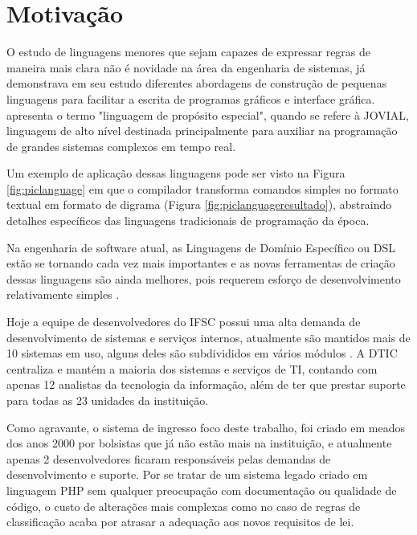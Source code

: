 \section{Motivação}
\label{motivacao}

O estudo de linguagens menores que sejam capazes de expressar regras de maneira mais clara não é novidade na área da engenharia de sistemas,  já demonstrava em seu estudo diferentes abordagens de construção de pequenas linguagens para facilitar a escrita de programas gráficos e interface gráfica.  apresenta o termo "linguagem de propósito especial", quando se refere à \gls{JOVIAL}, linguagem de alto nível destinada principalmente para auxiliar na programação de grandes sistemas complexos em tempo real. 

Um exemplo de aplicação dessas linguagens pode ser visto na Figura \ref{fig:piclanguage} em que o compilador transforma comandos simples no formato textual em formato de digrama (Figura \ref{fig:piclanguageresultado}), abstraindo detalhes específicos das linguagens tradicionais de programação da época.





Na engenharia de software atual, as Linguagens de Domínio Específico ou \gls{DSL} estão se tornando cada vez mais importantes e as novas ferramentas de criação dessas linguagens são ainda melhores, pois requerem esforço de desenvolvimento relativamente simples \cite{dslengineering}.


Hoje a equipe de desenvolvedores do \gls{IFSC} possui uma alta demanda de desenvolvimento de sistemas e serviços internos, atualmente são mantidos mais de 10 sistemas em uso, alguns deles são subdivididos em vários módulos \cite{catalogoifsc}. A \gls{DTIC} centraliza e mantém a maioria dos sistemas e serviços de TI, contando com apenas 12 analistas da tecnologia da informação, além de ter que prestar suporte para todas as 23 unidades da instituição. 

Como agravante, o sistema de ingresso foco deste trabalho, foi criado em meados dos anos 2000 por bolsistas que já não estão mais na instituição, e atualmente apenas 2 desenvolvedores ficaram responsáveis pelas demandas de desenvolvimento e suporte. Por se tratar de um sistema legado criado em linguagem PHP sem qualquer preocupação com documentação ou qualidade de código, o custo de alterações mais complexas como no caso de regras de classificação acaba por atrasar a adequação aos novos requisitos de lei. 

